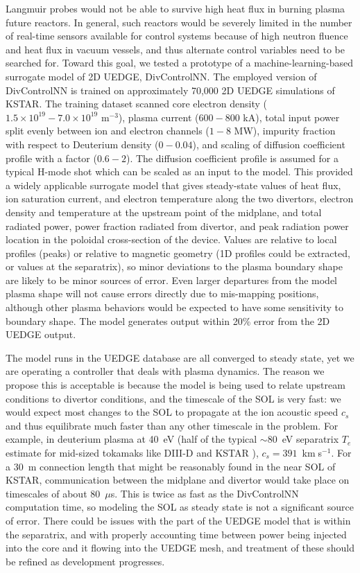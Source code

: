 Langmuir probes would not be able to survive high heat flux in burning plasma future reactors.
In general, such reactors would be severely limited in the number of real-time sensors available for control systems because of high neutron fluence and heat flux in vacuum vessels, and thus alternate control variables need to be searched for.
Toward this goal, we tested a prototype of a machine-learning-based surrogate model of 2D UEDGE, DivControlNN.
The employed version of DivControlNN is trained on approximately 70,000 2D UEDGE simulations of KSTAR.
The training dataset scanned core electron density ($1.5 \times 10^{19} - 7.0 \times 10^{19}$ m$^{-3}$), plasma current ($600-800$ kA), total input power split evenly between ion and electron channels ($1-8$ MW), impurity fraction with respect to Deuterium density ($0-0.04$), and scaling of diffusion coefficient profile with a factor ($0.6 - 2$).
The diffusion coefficient profile is assumed for a typical H-mode shot which can be scaled as an input to the model.
This provided a widely applicable surrogate model that gives steady-state values of heat flux, ion saturation current, and electron temperature along the two divertors, electron density and temperature at the upstream point of the midplane, and total radiated power, power fraction radiated from divertor, and peak radiation power location in the poloidal cross-section of the device.
Values are relative to local profiles (peaks) or relative to magnetic geometry (1D profiles could be extracted, or values at the separatrix), so minor deviations to the plasma boundary shape are likely to be minor sources of error.
Even larger departures from the model plasma shape will not cause errors directly due to mis-mapping positions, although other plasma behaviors would be expected to have some sensitivity to boundary shape.
The model generates output within 20\% error from the 2D UEDGE output.

The model runs in the UEDGE database are all converged to steady state, yet we are operating a controller that deals with plasma dynamics.
The reason we propose this is acceptable is because the model is being used to relate upstream conditions to divertor conditions, and the timescale of the SOL is very fast: we would expect most changes to the SOL to propagate at the ion acoustic speed $c_s$ and thus equilibrate much faster than any other timescale in the problem.
For example, in deuterium plasma at 40~eV (half of the typical $\sim80$~eV separatrix $T_e$ estimate for mid-sized tokamaks like \mbox{DIII-D} and KSTAR \cite{stangeby_2015_nf}), $c_s=391$~km$\;$s$^{-1}$.
For a 30~m connection length that might be reasonably found in the near SOL of KSTAR, communication between the midplane and divertor would take place on timescales of about 80~$\mu$s.
This is twice as fast as the DivControlNN computation time, so modeling the SOL as steady state is not a significant source of error.
There could be issues with the part of the UEDGE model that is within the separatrix, and with properly accounting time between power being injected into the core and it flowing into the UEDGE mesh, and treatment of these should be refined as development progresses.


